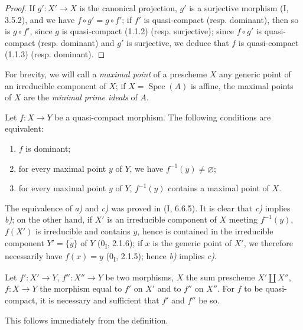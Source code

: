 \begin{proof}
If $g':X'\to X$ is the canonical projection, $g'$ is a surjective morphism
(I, 3.5.2), and we have $f\circ g'=g\circ f'$; if $f'$ is quasi-compact
(resp. dominant), then so is $g\circ f'$, since $g$ is
quasi-compact (1.1.2) (resp. surjective); since $f\circ g'$ is quasi-compact
(resp. dominant) and $g'$ is surjective, we deduce that $f$ is
quasi-compact (1.1.3) (resp. dominant).
\end{proof}


For brevity, we will call a \emph{maximal point} of a prescheme $X$ any
generic point of an irreducible component of $X$; if
$X=\operatorname{Spec}(A)$ is affine, the maximal points of $X$ are the
\emph{minimal prime ideals} of $A$.

\begin{proposition}[1.1.5]
\label{IV.1.1.5}
Let $f:X\to Y$ be a quasi-compact morphism. The following conditions are
equivalent:
\begin{enumerate}
  \item[a)] $f$ is dominant;
  \item[b)] for every maximal point $y$ of $Y$, we have
  $f^{-1}(y)\neq\varnothing$;
  \item[c)] for every maximal point $y$ of $Y$, $f^{-1}(y)$ contains a
  maximal point of $X$.
\end{enumerate}
\end{proposition}

The equivalence of \emph{a)} and \emph{c)} was proved in (I, 6.6.5). It
is clear that \emph{c)} implies \emph{b)}; on the other hand, if $X'$ is an
irreducible component of $X$ meeting $f^{-1}(y)$, $f(X')$ is
irreducible and contains $y$, hence is contained in the irreducible component
$Y'=\overline{\{y\}}$ of $Y$ (0\textsubscript{I}, 2.1.6); if $x$ is the
generic point of $X'$, we therefore necessarily have $f(x)=y$
(0\textsubscript{I}, 2.1.5); hence \emph{b)} implies \emph{c)}.

\begin{proposition}[1.1.6]
\label{IV.1.1.6}
Let $f':X'\to Y$, $f'':X''\to Y$ be two morphisms, $X$ the sum prescheme
$X'\coprod X''$, $f:X\to Y$ the morphism equal to $f'$ on $X'$ and to $f''$
on $X''$. For $f$ to be quasi-compact, it is necessary and sufficient that
$f'$ and $f''$ be so.
\end{proposition}

This follows immediately from the definition.

